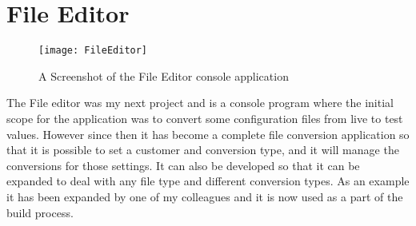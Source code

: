 \section{File Editor}{
	\begin{figure}
	\centering
	\texttt{[image: FileEditor]}
	\caption{A Screenshot of the File Editor console application}
	\label{fig:FileEditor}
	\end{figure}
	The File editor was my next project and is a console program where the initial scope for the application was to convert some configuration files from live to test values. However since then it has become a complete file conversion application so that it is possible to set a customer and conversion type, and it will manage the conversions for those settings. It can also be developed so that it can be expanded to deal with any file type and different conversion types. As an example it has been expanded by one of my colleagues and it is now used as a part of the build process.
}